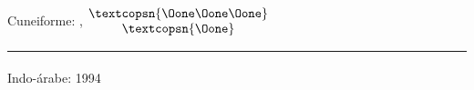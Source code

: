 \documentclass[11pt,a4paper]{article}
\begin{document}
\paragraph{} Cuneiforme: \textcopsn{\Oten\Oten\Oten\Oone\Oone},
\textcopsn{\Oten}
$
\begin{matrix*}[c]
	\textcopsn{\Oone\Oone\Oone}\\
	\textcopsn{\Oone}\\
\end{matrix*}
$


\vspace{0.5cm}

\hrule

\paragraph{} Indo-árabe: 1994

\newpage

\nocite{uabefoliotemplate}
\printbibliography[heading=bibintoc,title={Bibliografia}]
\listoftheorems[title={Lista de Teoremas}]
\end{document}
